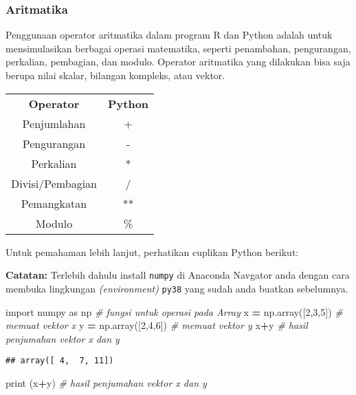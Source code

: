 \documentclass[
]{docs}
\newenvironment{Shaded}{\begin{snugshade}}{\end{snugshade}}
\newcommand{\BuiltInTok}[1]{#1}
\newcommand{\CommentTok}[1]{\textcolor[rgb]{0.56,0.35,0.01}{\textit{#1}}}
\newcommand{\DecValTok}[1]{\textcolor[rgb]{0.00,0.00,0.81}{#1}}
\newcommand{\ImportTok}[1]{#1}
\newcommand{\NormalTok}[1]{#1}
\newcommand{\OperatorTok}[1]{\textcolor[rgb]{0.81,0.36,0.00}{\textbf{#1}}}
\begin{document}
\hypertarget{aritmatika}{%
\subsubsection{Aritmatika}\label{aritmatika}}

Penggunaan operator aritmatika dalam program R dan Python adalah untuk mensimulasikan berbagai operasi matematika, seperti penambahan, pengurangan, perkalian, pembagian, dan modulo. Operator aritmatika yang dilakukan bisa saja berupa nilai skalar, bilangan kompleks, atau vektor.

\begin{longtable}[]{@{}cc@{}}
\toprule()
\endhead
\textbf{Operator} & \textbf{Python} \\
Penjumlahan & + \\
Pengurangan & - \\
Perkalian & * \\
Divisi/Pembagian & / \\
Pemangkatan & ** \\
Modulo & \% \\
\bottomrule()
\end{longtable}

Untuk pemahaman lebih lanjut, perhatikan cuplikan Python berikut:

\textbf{Catatan:} Terlebih dahulu install \texttt{numpy} di Anaconda Navgator anda dengan cara membuka lingkungan \emph{(environment)} \texttt{py38} yang sudah anda buatkan sebelumnya.

\begin{Shaded}
\begin{Highlighting}[]
\ImportTok{import}\NormalTok{ numpy }\ImportTok{as}\NormalTok{ np      }\CommentTok{\# fungsi untuk operasi pada Array}
\NormalTok{x }\OperatorTok{=}\NormalTok{ np.array([}\DecValTok{2}\NormalTok{,}\DecValTok{3}\NormalTok{,}\DecValTok{5}\NormalTok{])   }\CommentTok{\# memuat vektor x}
\NormalTok{y }\OperatorTok{=}\NormalTok{ np.array([}\DecValTok{2}\NormalTok{,}\DecValTok{4}\NormalTok{,}\DecValTok{6}\NormalTok{])   }\CommentTok{\# memuat vektor y}
\NormalTok{x}\OperatorTok{+}\NormalTok{y                     }\CommentTok{\# hasil penjumahan vektor x dan y}
\end{Highlighting}
\end{Shaded}

\begin{verbatim}
## array([ 4,  7, 11])
\end{verbatim}

\begin{Shaded}
\begin{Highlighting}[]
\BuiltInTok{print}\NormalTok{ (x}\OperatorTok{+}\NormalTok{y)             }\CommentTok{\# hasil penjumahan vektor x dan y}
\end{Highlighting}
\end{Shaded}
\end{document}
